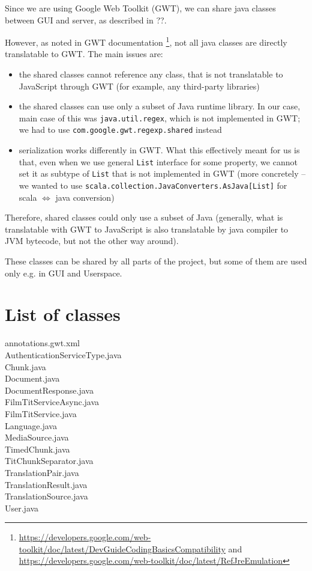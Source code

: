 Since we are using Google Web Toolkit (GWT), we can share java classes between GUI and server, as described in ??.

However, as noted in GWT documentation \footnote{\url{https://developers.google.com/web-toolkit/doc/latest/DevGuideCodingBasicsCompatibility} and \url{https://developers.google.com/web-toolkit/doc/latest/RefJreEmulation}}, not all java classes are directly translatable to GWT. The main issues are:

\begin{itemize}
\item the shared classes cannot reference any class, that is not translatable to JavaScript through GWT (for example, any third-party libraries)
\item the shared classes can use only a subset of Java runtime library. In our case, main case of this was \texttt{java.util.regex}, which is not implemented in GWT; we had to use \texttt{com.google.gwt.regexp.shared} instead
\item serialization works differently in GWT. What this effectively meant for us is that, even when we use general \texttt{List} interface for some property, we cannot set it as subtype of \texttt{List} that is not implemented in GWT (more concretely -- we wanted to use \texttt{scala.collection.JavaConverters.AsJava[List]} for scala $\Leftrightarrow$ java conversion)
\end{itemize}

Therefore, shared classes could only use a subset of Java (generally, what is translatable with GWT to JavaScript is also translatable by java compiler to JVM bytecode, but not the other way around).

These classes can be shared by all parts of the project, but some of them are used only e.g. in GUI and Userspace.
\section{List of classes}
annotations.gwt.xml \\
AuthenticationServiceType.java \\
Chunk.java \\
Document.java \\
DocumentResponse.java \\
FilmTitServiceAsync.java \\
FilmTitService.java \\
Language.java \\
MediaSource.java \\
TimedChunk.java \\
TitChunkSeparator.java \\
TranslationPair.java \\
TranslationResult.java \\
TranslationSource.java \\
User.java \\

